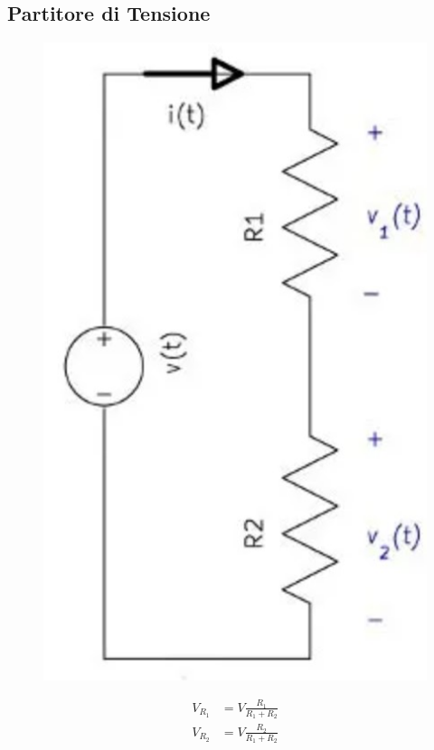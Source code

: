 \documentclass[fontsize=8pt]{scrartcl}
\begin{document}
\begin{multicols*}{2}
\subsection*{Partitore di Tensione}

\begin{minipage}[m]{.45\linewidth}
    \begin{figure}[H]
        \centering
        \includegraphics[width=.4\linewidth]{images/partitore_tensione.jpg}
    \end{figure}
\end{minipage}
\begin{minipage}[m]{.45\linewidth}
    \begin{align*}
        V_{R_1} &= V\frac{R_1}{R_1+R_2}\\
        V_{R_2} &= V\frac{R_2}{R_1+R_2}
    \end{align*}
\end{minipage}

\end{multicols*}
\end{document}

